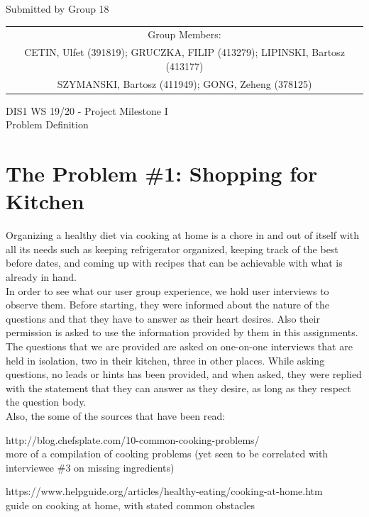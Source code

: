 \documentclass[a4paper,11pt,oneside]{scrreprt}
\begin{document}
\begin{center}
	Submitted by Group 18
	
	\bigskip
	
	\begin{tabular}{c}
	Group Members: \\
	CETIN, Ulfet (391819); GRUCZKA, FILIP (413279);	LIPINSKI, Bartosz (413177) \\
	SZYMANSKI, Bartosz (411949); GONG, Zeheng (378125)\\
	\end{tabular}

	\bigskip
	
	DIS1 WS 19/20 - Project Milestone I\\
	Problem Definition
	
\end{center}
\vspace{0cm}

\begingroup
\let\clearpage\relax
	\chapter{The Problem \#1: Shopping for Kitchen}
\endgroup
	
		\indent Organizing a healthy diet via cooking at home is a chore in and out of itself with all its needs such as keeping refrigerator organized, keeping track of the best before dates, and coming up with recipes that can be achievable with what is already in hand.\\
		
		In order to see what our user group experience, we hold user interviews to observe them. Before starting, they were informed about the nature of the questions and that they have to answer as their heart desires. Also their permission is asked to use the information provided by them in this assignments. The questions that we are provided are asked on one-on-one interviews that are held in isolation, two in their kitchen, three in other places. While asking questions, no leads or hints has been provided, and when asked, they were replied with the statement that they can answer as they desire, as long as they respect the question body.\\
		
		Also, the some of the sources that have been read:
			\begin{compactitem}
				\item http://blog.chefsplate.com/10-common-cooking-problems/\\
				more of a compilation of cooking problems (yet seen to be correlated with interviewee \#3 on missing ingredients)
				
				\item https://www.helpguide.org/articles/healthy-eating/cooking-at-home.htm\\
				guide on cooking at home, with stated common obstacles
				
				
			\end{compactitem}
		
\end{document}
